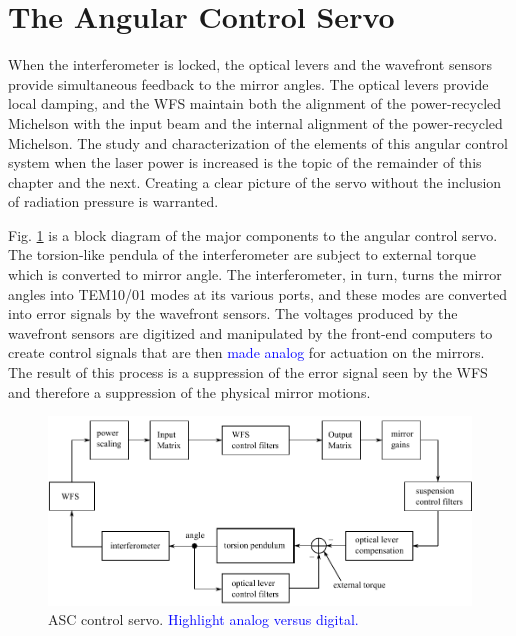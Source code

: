 \section{The Angular Control Servo}
When the interferometer is locked, the optical levers and the wavefront sensors provide simultaneous feedback to the mirror angles. The optical levers provide local damping, and the WFS maintain both the alignment of the power-recycled Michelson with the input beam and the internal alignment of the power-recycled Michelson. The study and characterization of the elements of this angular control system when the laser power is increased is the topic of the remainder of this chapter and the next. Creating a clear picture of the servo without the inclusion of radiation pressure is warranted.

Fig. \ref{fig:ASCcontrolservo} is a block diagram of the major components to the angular control servo. The torsion-like pendula of the interferometer are subject to external torque which is converted to mirror angle. The interferometer, in turn, turns the mirror angles into TEM10/01 modes at its various ports, and these modes are converted into error signals by the wavefront sensors. The voltages produced by the wavefront sensors are digitized and manipulated by the front-end computers to create control signals that are then \textcolor{blue}{made analog} for actuation on the mirrors. The result of this process is a suppression of the error signal seen by the WFS and therefore a suppression of the physical mirror motions. 

\begin{figure} 
\begin{centering} 
\includegraphics{figures/ASCcontrolservo.pdf} 
\caption[ASC control servo]{ASC control servo. \textcolor{blue}{Highlight analog versus digital.}}
\label{fig:ASCcontrolservo}
\end{centering}
\end{figure}

